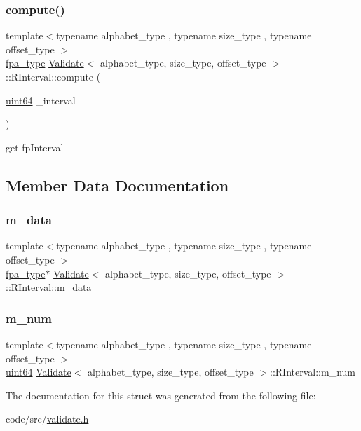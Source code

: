 \subsubsection{\texorpdfstring{compute()}{compute()}}
{\footnotesize\ttfamily template$<$typename alphabet\+\_\+type , typename size\+\_\+type , typename offset\+\_\+type $>$ \\
\hyperlink{common_8h_a7fdaf8b9b3d2f6ae6b10597a8d3f96ee}{fpa\+\_\+type} \hyperlink{class_validate}{Validate}$<$ alphabet\+\_\+type, size\+\_\+type, offset\+\_\+type $>$\+::R\+Interval\+::compute (\begin{DoxyParamCaption}\item[{\hyperlink{types_8h_a60e8696a4678cd348e991a1f172e53f7}{uint64}}]{\+\_\+interval }\end{DoxyParamCaption})\hspace{0.3cm}{\ttfamily [inline]}}



get fp\+Interval 



\subsection{Member Data Documentation}
\mbox{\label{struct_validate_1_1_r_interval_a163e4054b0e05de3538c1011a9f4c664}} 
\subsubsection{\texorpdfstring{m\+\_\+data}{m\_data}}
{\footnotesize\ttfamily template$<$typename alphabet\+\_\+type , typename size\+\_\+type , typename offset\+\_\+type $>$ \\
\hyperlink{common_8h_a7fdaf8b9b3d2f6ae6b10597a8d3f96ee}{fpa\+\_\+type}$\ast$ \hyperlink{class_validate}{Validate}$<$ alphabet\+\_\+type, size\+\_\+type, offset\+\_\+type $>$\+::R\+Interval\+::m\+\_\+data}

\mbox{\label{struct_validate_1_1_r_interval_ab24650a97073141c105fdb3db61ca902}} 
\subsubsection{\texorpdfstring{m\+\_\+num}{m\_num}}
{\footnotesize\ttfamily template$<$typename alphabet\+\_\+type , typename size\+\_\+type , typename offset\+\_\+type $>$ \\
\hyperlink{types_8h_a60e8696a4678cd348e991a1f172e53f7}{uint64} \hyperlink{class_validate}{Validate}$<$ alphabet\+\_\+type, size\+\_\+type, offset\+\_\+type $>$\+::R\+Interval\+::m\+\_\+num}



The documentation for this struct was generated from the following file\+:\begin{DoxyCompactItemize}
\item 
code/src/\hyperlink{validate_8h}{validate.\+h}\end{DoxyCompactItemize}
